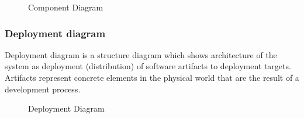 \documentclass[12pt,a4paper]{report}
\begin{document}
\begin{figure}[h]
	\begin{center}
		\caption{Component Diagram}
	\end{center}
\end{figure}


\subsubsection{Deployment diagram}
Deployment diagram is a structure diagram which shows architecture of the system as deployment (distribution) of software artifacts to deployment targets. Artifacts represent concrete elements in the physical world that are the result of a development process.

\begin{figure}[ht]
	\begin{center}
		\caption{Deployment Diagram}
	\end{center}
\end{figure}
\newpage
\end{document}
